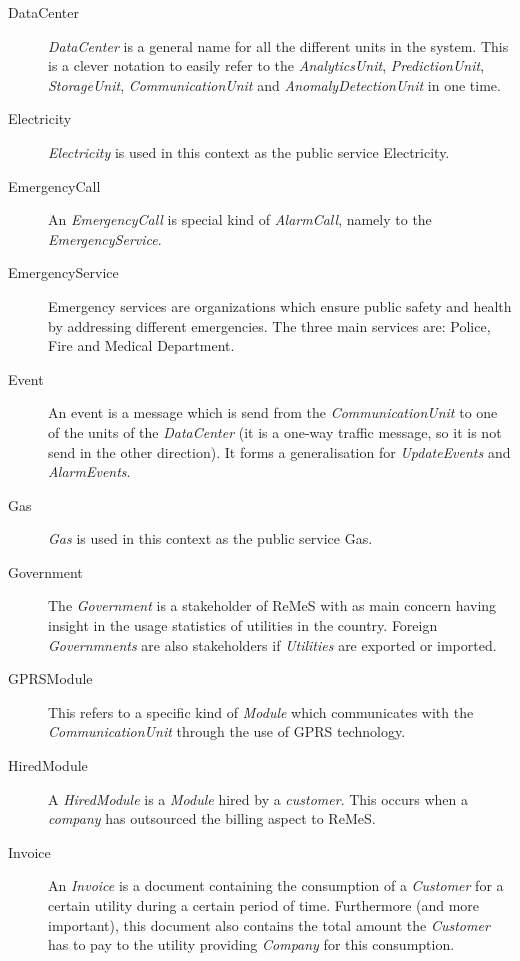 \begin{description}
\item[DataCenter] \emph{DataCenter} is a general name for all the different
units in the system. This is a clever notation to easily refer to
the \emph{AnalyticsUnit}, \emph{PredictionUnit}, \emph{StorageUnit}, \emph{CommunicationUnit}
and \emph{AnomalyDetectionUnit} in one time.

\item[Electricity] \emph{Electricity} is used in this context as the public
service Electricity.

\item[EmergencyCall] An \emph{EmergencyCall} is special kind of
\emph{AlarmCall}, namely to the \emph{EmergencyService}.

\item[EmergencyService] Emergency services are organizations which ensure public
safety and health by addressing different emergencies. The three main services
are: Police, Fire and Medical Department.

\item[Event] An event is a message which is send from the
\emph{CommunicationUnit} to one of the units of the \emph{DataCenter} (it is a
one-way traffic message, so it is not send in the other direction). It forms a
generalisation for \emph{UpdateEvents} and \emph{AlarmEvents}.

\item[Gas] \emph{Gas} is used in this context as the public service Gas.

\item[Government] The \emph{Government} is a stakeholder of ReMeS with as main
concern having insight in the usage statistics of utilities in the country.
Foreign \emph{Governmnents} are also stakeholders if \emph{Utilities} are
exported or imported.

\item[GPRSModule] This refers to a specific kind of \emph{Module} which
communicates with the \emph{CommunicationUnit} through the use of GPRS
technology.

\item[HiredModule] A \emph{HiredModule} is a \emph{Module} hired by a
\emph{customer}. This occurs when a \emph{company} has outsourced the billing
aspect to ReMeS.

\item[Invoice] An \emph{Invoice} is a document containing the consumption of a
\emph{Customer} for a certain utility during a certain period of time.
Furthermore (and more important), this document also contains the total amount
the \emph{Customer} has to pay to the utility providing \emph{Company} for this
consumption.


\end{description}
